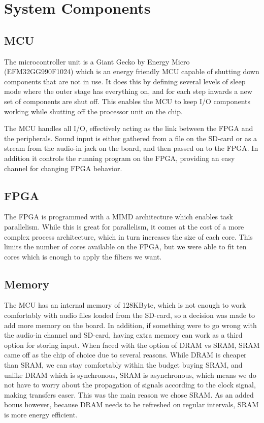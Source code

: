 \section{System Components}
\subsection{MCU}
The microcontroller unit is a Giant Gecko by Energy Micro (EFM32GG990F1024) which is an energy friendly MCU capable of shutting down components that are not in use. It does this by defining several levels of sleep mode where the outer stage has everything on, and for each step inwards a new set of components are shut off. This enables the MCU to keep I/O components working while shutting off the processor unit on the chip.

The MCU handles all I/O, effectively acting as the link between the FPGA and the peripherals. Sound input is either gathered from a file on the SD-card or as a stream from the audio-in jack on the board, and then passed on to the FPGA. In addition it controls the running program on the FPGA, providing an easy channel for changing FPGA behavior.
\subsection{FPGA}
The FPGA is programmed with a MIMD architecture which enables task parallelism. While this is great for parallelism, it comes at the cost of a more complex process architecture, which in turn increases the size of each core. This limits the number of cores available on the FPGA, but we were able to fit ten cores which is enough to apply the filters we want.
\subsection{Memory}
The MCU has an internal memory of 128KByte, which is not enough to work comfortably with audio files loaded from the SD-card, so a decision was made to add more memory on the board. In addition, if something were to go wrong with the audio-in channel and SD-card, having extra memory can work as a third option for storing input. When faced with the option of DRAM vs SRAM, SRAM came off as the chip of choice due to several reasons. While DRAM is cheaper than SRAM, we can stay comfortably within the budget buying SRAM, and unlike DRAM which is synchronous, SRAM is asynchronous, which means we do not have to worry about the propagation of signals according to the clock signal, making transfers easer. This was the main reason we chose SRAM. As an added bonus however, because DRAM needs to be refreshed on regular intervals, SRAM is more energy efficient.
